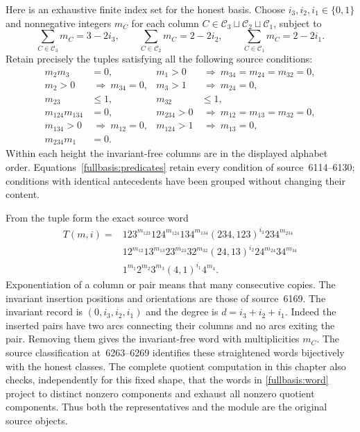 Here is an exhaustive finite index set for the honest basis.  Choose
$i_3,i_2,i_1\in\{0,1\}$ and nonnegative integers $m_C$ for each column
$C\in\mathcal C_3\sqcup\mathcal C_2\sqcup\mathcal C_1$, subject to
\begin{equation}\label{fullbasis:counts}
 \sum_{C\in\mathcal C_3}m_C=3-2i_3,\qquad
 \sum_{C\in\mathcal C_2}m_C=2-2i_2,\qquad
 \sum_{C\in\mathcal C_1}m_C=2-2i_1.
\end{equation}
Retain precisely the tuples satisfying all the following source
conditions:
\begin{align}
 m_2m_3&=0,&
 m_1>0&\ \Longrightarrow\ m_{34}=m_{24}=m_{32}=0,\nonumber\\
 m_2>0&\ \Longrightarrow\ m_{34}=0,&
 m_3>1&\ \Longrightarrow\ m_{24}=0,\nonumber\\
 m_{23}&\leq1,&m_{32}&\leq1,\nonumber\\
 m_{124}m_{134}&=0,&
 m_{234}>0&\ \Longrightarrow\ m_{12}=m_{13}=m_{32}=0,\nonumber\\
 m_{134}>0&\ \Longrightarrow\ m_{12}=0,&
 m_{124}>1&\ \Longrightarrow\ m_{13}=0,\nonumber\\
 m_{234}m_1&=0.&&\label{fullbasis:predicates}
\end{align}
Within each height the invariant-free columns are in the displayed
alphabet order.  Equations~\eqref{fullbasis:predicates} retain every
condition of source~6114--6130; conditions with identical antecedents
have been grouped without changing their content.

From the tuple form the exact source word
\begin{equation}\label{fullbasis:word}
\begin{aligned}
 T(m,i)={}&123^{m_{123}}124^{m_{124}}134^{m_{134}}
 (234,123)^{i_3}234^{m_{234}}\\[-1mm]
 &12^{m_{12}}13^{m_{13}}23^{m_{23}}32^{m_{32}}
 (24,13)^{i_2}24^{m_{24}}34^{m_{34}}\\[-1mm]
 &1^{m_1}2^{m_2}3^{m_3}(4,1)^{i_1}4^{m_4}.
\end{aligned}
\end{equation}
Exponentiation of a column or pair means that many consecutive copies.
The invariant insertion positions and orientations are those of
source~6169.  The invariant record is $(0,i_3,i_2,i_1)$ and the degree
is $d=i_3+i_2+i_1$.  Indeed the inserted pairs have two arcs connecting
their columns and no arcs exiting the pair.  Removing them gives the
invariant-free word with multiplicities $m_C$.  The source classification
at~6263--6269 identifies these straightened words bijectively with the
honest classes.  The complete quotient computation in this chapter also
checks, independently for this fixed shape, that the words in
\eqref{fullbasis:word} project to distinct nonzero components and exhaust
all nonzero quotient components.  Thus both the representatives and the
module are the original source objects.

